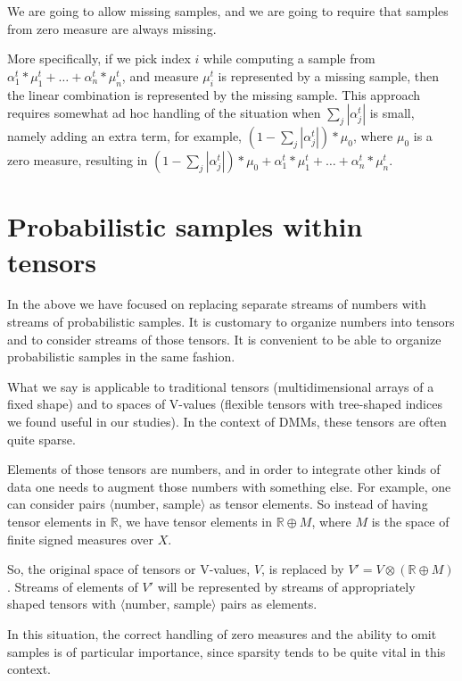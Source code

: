 \documentclass{article}
\begin{document}
We are going to allow missing samples, and we are going to require that samples from zero measure are always missing.

More specifically, if we pick index $i$ while computing a sample from $\alpha_1^t * \mu_1^t + \dots +  \alpha_n^t * \mu_n^t$,
and measure $\mu_i^t$ is represented by a missing sample, then the linear combination is represented by the missing sample.
This approach requires somewhat ad hoc handling of the situation when $\sum_j |\alpha_j^t| $ is small, namely adding an extra term,
for example, $(1-\sum_j |\alpha_j^t|)*\mu_0$, where $\mu_0$ is a zero measure, resulting in
$(1-\sum_j |\alpha_j^t|)*\mu_0 + \alpha_1^t * \mu_1^t + \dots +  \alpha_n^t * \mu_n^t$.



\section{Probabilistic samples within tensors}

In the above we have focused on replacing separate streams of numbers with streams of probabilistic samples.
It is customary to organize numbers into tensors and to consider streams of those tensors. It is convenient to be able to
organize probabilistic samples in the same fashion.

What we say is applicable to traditional tensors (multidimensional arrays of a fixed shape) and to spaces of V-values
(flexible tensors with tree-shaped indices we found useful in our studies). In the context of DMMs, these tensors are
often quite sparse.

Elements of those tensors are numbers, and in order to integrate other kinds of data
one needs to augment those numbers with something else. For example, one can consider pairs $\langle$number, sample$\rangle$ as
tensor elements. So instead of having tensor elements in $\mathbb{R}$, we have tensor elements in $\mathbb{R} \oplus M$, where $M$
is the space of finite signed measures over $X$.

So, the original space of tensors or V-values, $V$,  is replaced by $V' = V \otimes (\mathbb{R} \oplus M)$. Streams of elements of
$V'$ will be represented by streams of appropriately shaped tensors with $\langle$number, sample$\rangle$
pairs as elements.

In this situation, the correct handling of zero measures and the ability to omit samples is of particular importance, since sparsity tends to be
quite vital in this context.
\end{document}

